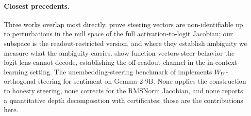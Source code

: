 \paragraph{Closest precedents.}
Three works overlap most directly. \citet{venkatesh2026nonid} prove steering vectors are non-identifiable up to perturbations in the null space of the full activation-to-logit Jacobian; our subspace is the readout-restricted version, and where they establish ambiguity we measure what the ambiguity carries. \citet{nadaf2026function} show function vectors steer behavior the logit lens cannot decode, establishing the off-readout channel in the in-context-learning setting. The unembedding-steering benchmark of \citet{hughvd2024benchmark} implements $W_{U}$-orthogonal steering for sentiment on Gemma-2-9B. None applies the construction to honesty steering, none corrects for the RMSNorm Jacobian, and none reports a quantitative depth decomposition with certificates; those are the contributions here.
